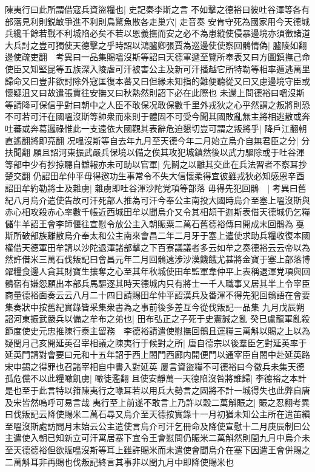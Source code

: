 陳夷行曰此所謂借寇兵資盜糧也|{
	史記秦李斯之言}
不如擊之德裕曰彼吐谷渾等各有部落見利則鋭敏爭進不利則鳥驚魚散各走巢穴|{
	走音奏}
安肯守死為國家用今天德城兵纔千餘若戰不利城陷必矣不若以恩義撫而安之必不為患縱使侵暴邊境亦須徵諸道大兵討之豈可獨使天德擊之乎時詔以鴻臚卿張賈為巡邊使使察回鶻情偽|{
	臚陵如翻邊使疏吏翻　考異曰一品集賜嗢沒斯等詔曰天德軍遞至覽所奉表又曰方圖鎮撫己命使臣又知堅昆等五族深入陵虐可汗被害公主及新可汗播越它所特勒等相率遁逃萬里歸命又曰豈非欲討除外寇匡復本蕃又曰但緣未知指的難便聽從又曰又慮邊境守臣或懷疑沮又曰故遣張賈往安撫又曰秋熱然則詔下必在此際也}
未還上問德裕曰嗢沒斯等請降可保信乎對曰朝中之人臣不敢保况敢保數千里外戎狄之心乎然謂之叛將則恐不可若可汗在國嗢沒斯等帥衆而來則于體固不可受今聞其國敗亂無主將相逃散或奔吐蕃或奔葛邏祿惟此一支遠依大國觀其表辭危迫懇切豈可謂之叛將乎|{
	降戶江翻朝直遙翻將即亮翻}
况嗢沒斯等自去年九月至天德今年二月始立烏介自無君臣之分|{
	分扶聞翻}
願且詔河東振武嚴兵保境以備之俟其攻犯城鎮然後以武力驅除或于吐谷渾等部中少有抄掠聽自讎報亦未可助以官軍|{
	先鬭之以離其交此在兵法習者不察耳抄楚交翻}
仍詔田牟仲平毋得邀功生事常令不失大信懷柔得宜彼雖戎狄必知感恩辛酉詔田牟約勒將士及雜虜|{
	雜虜即吐谷渾沙陀党項等部落}
毋得先犯回鶻　|{
	考異曰舊紀八月烏介遣使告故可汗死部人推為可汗今奉公主南投大國時烏介至塞上嗢沒斯與赤心相攻殺赤心率數千帳近西城田牟以聞烏介又令其相頡干迦斯表借天德城仍乞糧儲牛羊詔王會李師偃往宣慰令放公主入朝賑粟二萬石舊德裕傳曰開成末回鶻為戛斯所破部族離散烏介奉太和公主南來會昌二年二月牙于塞上遣使求助兵糧收復本國權借天德軍田牟請以沙陀退渾諸部擊之下百寮議議者多云如牟之奏德裕云云帝以為然許借米三萬石伐叛記曰會昌元年二月回鶻遠涉沙漠饑餓尤甚將金寶于塞上部落博糴糧食邊人貪其財寶生攘奪之心至其年秋城使田牟監軍韋仲平上表稱退渾党項與回鶻宿有嫌怨願出本部兵馬驅逐其時天德城内只有將士一千人職事又居其半上令宰臣商量德裕面奏云云八月二十四日請賜田牟仲平詔漢兵及番渾不得先犯回鶻語在會要集奏狀中按舊紀實錄皆采集衆書為之事前後多差互今從伐叛記一品集}
九月戊辰朔詔河東振武嚴兵以備之牟布之弟也|{
	田布弘正之子死于史憲誠之亂}
癸巳盧龍軍亂殺節度使史元忠推陳行泰主留務　李德裕請遣使慰撫回鶻且運糧三萬斛以賜之上以為疑閏月己亥開延英召宰相議之陳夷行于候對之所|{
	唐自德宗以後羣臣乞對延英率于延英門請對會要曰元和十五年詔于西上閤門西廊内開便門以通宰臣自閤中赴延英路宋申錫之得罪也召諸宰相自中書入對延英}
屢言資盜糧不可德裕曰今徵兵未集天德孤危儻不以此糧噉飢虜|{
	噉徒濫翻}
且使安靜萬一天德陷沒咎將誰歸|{
	李德裕之本計是也至于此言特以箝陳夷行之喙耳若以用兵大勢言之固將不計一城得失也此弊自唐及宋皆然嗚呼可易言哉}
夷行至上前遂不敢言上乃許以穀二萬斛賑之|{
	賑之忍翻考異曰伐叛記云降使賜米二萬石尋又烏介至天德按實錄十一月初猶未知公主所在遣苖縝至嗢沒斯處訪問月末始云公主遣使言烏介可汗乞冊命及降使宣慰十二月庚辰制曰公主遣使入朝已知新立可汗寓居塞下宜令王會慰問仍賑米二萬斛然則閏九月中烏介未至天德德裕但欲賑嗢沒斯等耳上雖許賜米而未遣使會聞烏介在塞下因遣王會併賜之二萬斛耳非再賜也伐叛記終言其事非以閏九月中即降使賜米也}

